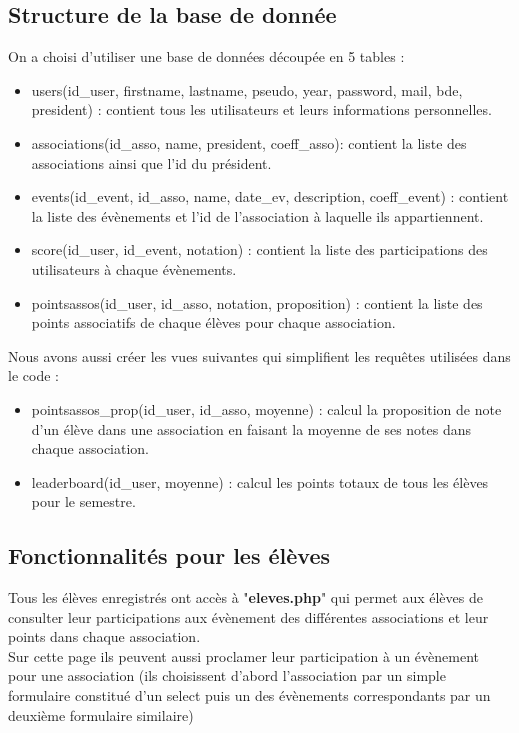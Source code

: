 \documentclass[french]{article}
\begin{document}
 \subsection{Structure de la base de donnée}
 On a choisi d'utiliser une base de données découpée en 5 tables : \\
 \begin{itemize}
 	\item users(id\_user, firstname, lastname, pseudo, year, password, mail, bde, president) : contient tous les utilisateurs et leurs informations personnelles.
 	\item associations(id\_asso, name, president, coeff\_asso): contient la liste des associations ainsi que l'id du président.
 	\item events(id\_event, id\_asso, name, date\_ev, description, coeff\_event) : contient la liste des évènements et l'id de l'association à laquelle ils appartiennent.
 	\item score(id\_user, id\_event, notation) : contient la liste des participations des utilisateurs à chaque évènements.
 	\item pointsassos(id\_user, id\_asso, notation, proposition) : contient la liste des points associatifs de chaque élèves pour chaque association.\\
 \end{itemize} 

Nous avons aussi créer les vues suivantes qui simplifient les requêtes utilisées dans le code : \\
\begin{itemize}
	\item pointsassos\_prop(id\_user, id\_asso, moyenne) : calcul la proposition de note d'un élève dans une association en faisant la moyenne de ses notes dans chaque association.
	\item leaderboard(id\_user, moyenne) : calcul les points totaux de tous les élèves pour le semestre.
\end{itemize}
\subsection{Fonctionnalités pour les élèves}
	Tous les élèves enregistrés ont accès à "\textbf{eleves.php}" qui permet aux élèves de consulter leur participations aux évènement des différentes associations et leur points dans chaque association. \\
	Sur cette page ils peuvent aussi proclamer leur participation à un évènement pour une association (ils choisissent d'abord l'association par un simple formulaire constitué d'un select puis un des évènements correspondants par un deuxième formulaire similaire)\\
	
\end{document}
